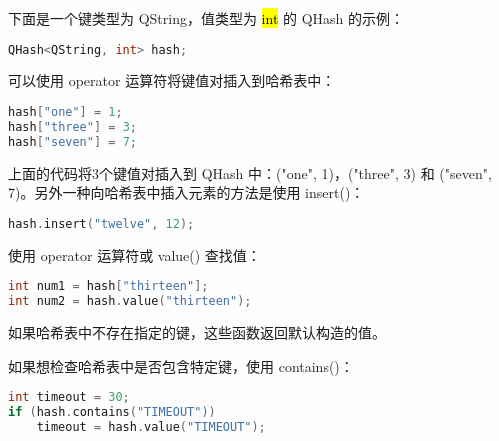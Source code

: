 下面是一个键类型为 QString，值类型为 \hl{int} 的 QHash 的示例：

\begin{lstlisting}[language=C++]
QHash<QString, int> hash;
\end{lstlisting}


可以使用 operator 运算符将键值对插入到哈希表中：

\begin{lstlisting}[language=C++]
hash["one"] = 1;
hash["three"] = 3;
hash["seven"] = 7;
\end{lstlisting}

上面的代码将3个键值对插入到 QHash 中：("one", 1)，("three", 3) 和
("seven", 7)。另外一种向哈希表中插入元素的方法是使用 insert()：

\begin{lstlisting}[language=C++]
hash.insert("twelve", 12);
\end{lstlisting}

使用 operator 运算符或 value() 查找值：

\begin{lstlisting}[language=C++]
int num1 = hash["thirteen"];
int num2 = hash.value("thirteen");
\end{lstlisting}

如果哈希表中不存在指定的键，这些函数返回默认构造的值。

如果想检查哈希表中是否包含特定键，使用 contains()：

\begin{lstlisting}[language=C++]
int timeout = 30;
if (hash.contains("TIMEOUT"))
    timeout = hash.value("TIMEOUT");
\end{lstlisting}

